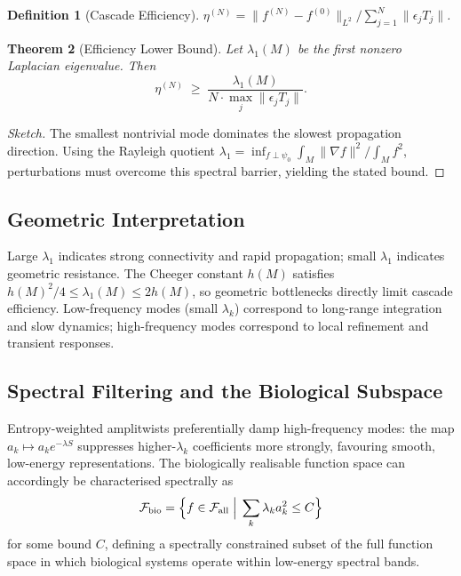 \documentclass[12pt, a4paper]{article}
\newtheorem{theorem}{Theorem}[section]
\newtheorem{definition}[theorem]{Definition}
\theoremstyle{remark}
\theoremstyle{definition}
\begin{document}
\begin{definition}[Cascade Efficiency]
$\eta^{(N)} = \|f^{(N)} - f^{(0)}\|_{L^2} \big/ \sum_{j=1}^N \|\epsilon_j T_j\|$.
\end{definition}

\begin{theorem}[Efficiency Lower Bound]
\label{thm:efficiency}
Let $\lambda_1(M)$ be the first nonzero Laplacian eigenvalue.  Then
\[
\eta^{(N)} \;\ge\;
\frac{\lambda_1(M)}{N\cdot\max_j\|\epsilon_j T_j\|}.
\]
\end{theorem}

\begin{proof}[Sketch]
The smallest nontrivial mode dominates the slowest propagation direction.  Using the
Rayleigh quotient $\lambda_1 = \inf_{f \perp \psi_0} \int_M \|\nabla f\|^2 / \int_M f^2$,
perturbations must overcome this spectral barrier, yielding the stated bound.
\end{proof}

\subsection{Geometric Interpretation}

Large $\lambda_1$ indicates strong connectivity and rapid propagation; small $\lambda_1$
indicates geometric resistance.  The Cheeger constant $h(M)$ satisfies
$h(M)^2/4 \le \lambda_1(M) \le 2h(M)$, so geometric bottlenecks directly limit cascade
efficiency.  Low-frequency modes (small $\lambda_k$) correspond to long-range integration
and slow dynamics; high-frequency modes correspond to local refinement and transient
responses.

\subsection{Spectral Filtering and the Biological Subspace}

Entropy-weighted amplitwists preferentially damp high-frequency modes: the map
$a_k \mapsto a_k e^{-\lambda S}$ suppresses higher-$\lambda_k$ coefficients more
strongly, favouring smooth, low-energy representations.  The biologically realisable
function space can accordingly be characterised spectrally as
\[
\mathcal{F}_{\mathrm{bio}}
= \Bigl\{f \in \mathcal{F}_{\mathrm{all}} \;\Big|\; \sum_k \lambda_k a_k^2 \le C\Bigr\}
\]
for some bound $C$, defining a spectrally constrained subset of the full function space in
which biological systems operate within low-energy spectral bands.
\end{document}
